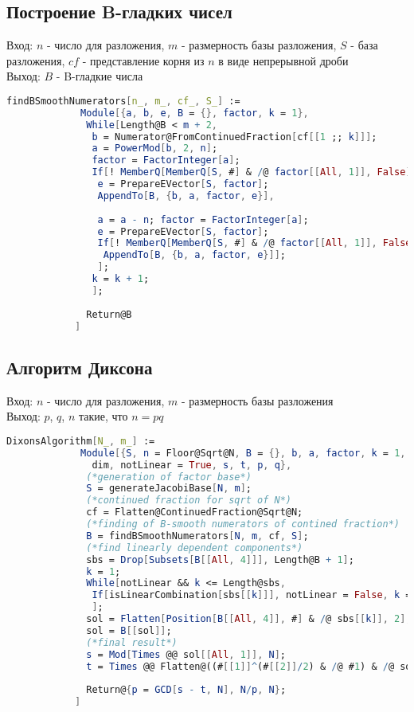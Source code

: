 		\subsection{Построение B-гладких чисел}
			Вход: $n$ - число для разложения, $m$ - размерность базы разложения, $S$ - база разложения, $cf$ - представление корня из $n$ в виде
			непрерывной дроби\\
			Выход: $B$ - B-гладкие числа

			\begin{lstlisting}[language=Mathematica,caption={
	      		Построение B-гладких чисел
	    	}]
			findBSmoothNumerators[n_, m_, cf_, S_] := 
			 Module[{a, b, e, B = {}, factor, k = 1},
			  While[Length@B < m + 2,
			   b = Numerator@FromContinuedFraction[cf[[1 ;; k]]];
			   a = PowerMod[b, 2, n];
			   factor = FactorInteger[a];
			   If[! MemberQ[MemberQ[S, #] & /@ factor[[All, 1]], False],
			    e = PrepareEVector[S, factor];
			    AppendTo[B, {b, a, factor, e}],
			    
			    a = a - n; factor = FactorInteger[a];
			    e = PrepareEVector[S, factor];
			    If[! MemberQ[MemberQ[S, #] & /@ factor[[All, 1]], False], 
			     AppendTo[B, {b, a, factor, e}]];
			    ];
			   k = k + 1;
			   ];
			  
			  Return@B
			]
	    	\end{lstlisting}

		\subsection{Алгоритм Диксона}
			Вход: $n$ - число для разложения, $m$ - размерность базы разложения \\
			Выход: $p$, $q$, $n$ такие, что $n = p q$

			\begin{lstlisting}[language=Mathematica,caption={
      			Алгоритм Диксона
    		}]
			DixonsAlgorithm[N_, m_] := 
			 Module[{S, n = Floor@Sqrt@N, B = {}, b, a, factor, k = 1, cf, e, sbs, sol, 
			   dim, notLinear = True, s, t, p, q},
			  (*generation of factor base*)
			  S = generateJacobiBase[N, m];
			  (*continued fraction for sqrt of N*)
			  cf = Flatten@ContinuedFraction@Sqrt@N;
			  (*finding of B-smooth numerators of contined fraction*)
			  B = findBSmoothNumerators[N, m, cf, S];
			  (*find linearly dependent components*)
			  sbs = Drop[Subsets[B[[All, 4]]], Length@B + 1];
			  k = 1;
			  While[notLinear && k <= Length@sbs,
			   If[isLinearCombination[sbs[[k]]], notLinear = False, k = k + 1];
			   ];
			  sol = Flatten[Position[B[[All, 4]], #] & /@ sbs[[k]], 2];
			  sol = B[[sol]];
			  (*final result*)
			  s = Mod[Times @@ sol[[All, 1]], N];
			  t = Times @@ Flatten@((#[[1]]^(#[[2]]/2) & /@ #1) & /@ sol[[All, 3]]);
			  
			  Return@{p = GCD[s - t, N], N/p, N};
			]
	    	\end{lstlisting}

